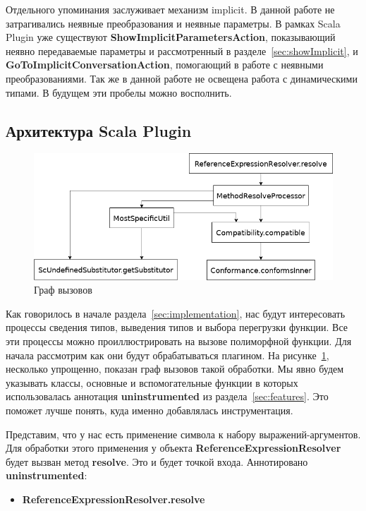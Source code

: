 Отдельного упоминания заслуживает механизм implicit.
В данной работе не затрагивались неявные преобразования и неявные параметры.
В рамках Scala Plugin уже существуют \textbf{ShowImplicitParametersAction},
показывающий неявно передаваемые параметры и рассмотренный в
разделе~\ref{sec:showImplicit}, и \textbf{GoToImplicitConversationAction},
помогающий в работе с неявными преобразованиями.
Так же в данной работе не освещена работа с динамическими типами.
В будущем эти пробелы можно восполнить.

\subsection{Архитектура Scala Plugin}
\label{sec:arch}

\begin{figure}[t]
\centering
\includegraphics[width=\textwidth]{img/call-graph}
\caption{Граф вызовов}
\label{fig:callGraph}
\end{figure}

Как говорилось в начале раздела~\ref{sec:implementation}, нас будут интересовать
процессы сведения типов, выведения типов и выбора перегрузки функции.
Все эти процессы можно проиллюстрировать на вызове полиморфной функции.
Для начала рассмотрим как они будут обрабатываться плагином.
На рисунке~\ref{fig:callGraph}, несколько упрощенно, показан граф вызовов
такой обработки.
Мы явно будем указывать классы, основные и вспомогательные функции в которых
использовалась аннотация \textbf{uninstrumented} из раздела~\ref{sec:features}.
Это поможет лучше понять, куда именно добавлялась инструментация.

Представим, что у нас есть применение символа к набору выражений-аргументов.
Для обработки этого применения у объекта \textbf{ReferenceExpressionResolver}
будет вызван метод \textbf{resolve}.
Это и будет точкой входа.
Аннотировано \textbf{uninstrumented}:
\begin{itemize}
  \item \textbf{ReferenceExpressionResolver.resolve}
\end{itemize}

